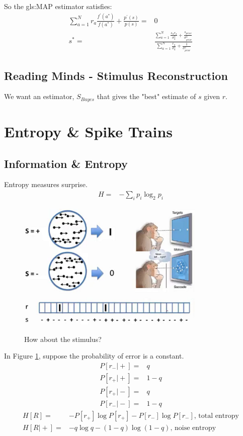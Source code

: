 \documentclass[]{article}
\begin{document}
So the \gls{gls:MAP} estimator satisfies:
\begin{align*}
	\sum_{a=1}^{N} r_a \frac{f^\prime(a^*)}{f(a^*)} + \frac{p^\prime(s)}{p(s)}=&0\\
	s^*  =& \frac{\sum_{a=1}^{N}   \frac{s_a r_a}{\sigma_a^2}+\frac{s_{prior}}{\sigma_{prior}^2}}{\sum_{a=1}^{N} \frac{ r_a }{\sigma_a^2}+\frac{1}{\sigma_{prior}^2}}
\end{align*}
\subsection{Reading Minds - Stimulus Reconstruction}
We want an estimator, $S_{Bayes}$ that gives the "best" estimate of $s$ given $r$.

\section{Entropy \& Spike Trains}\label{sec:week4}

\subsection{Information \& Entropy}

Entropy measures surprise.
\begin{align*}
	H =& - \sum_{i} p_i \log_2 p_i
\end{align*}

\begin{figure}[H]
	\begin{center}
		\caption{How about the stimulus?}
		\includegraphics[width=0.8\textwidth]{how}\label{fig:how:about:the:stimulus}
	\end{center}
\end{figure}

In Figure \ref{fig:how:about:the:stimulus}, suppose the probability of error is a constant.
\begin{align*}
	P[r_-\vert +] =& q\\
	P[r_+\vert +] =& 1-q\\
	P[r_+\vert -] =& q\\
	P[r_-\vert -] =& 1-q
\end{align*}
\begin{align*}
	H[R] =& -P[r_+] \log P[r_+] - P[r_-] \log P[r_-] \text{, total entropy}\\
	H[R\vert +] =& -q \log q - (1-q) \log (1-q) \text{, noise entropy}
\end{align*}
\end{document}
